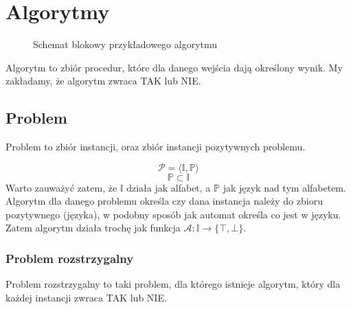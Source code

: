 \documentclass{../notatki}
\begin{document}
\section{Algorytmy}

\begin{figure}[H]
    \centering
    \caption{Schemat blokowy przykładowego algorytmu}
\end{figure}

Algorytm to zbiór procedur, które dla danego wejścia dają określony wynik. My zakładamy, że algorytm zwraca TAK lub NIE.

\subsection{Problem}

Problem to zbiór instancji, oraz zbiór instancji pozytywnych problemu.

$$
\mathcal{P} = \langle \mathbb{I}, \mathbb{P} \rangle
$$
$$
\mathbb{P} \subset \mathbb{I}
$$
Warto zauważyć zatem, że $\mathbb{I}$ działa jak alfabet, a $\mathbb{P}$ jak język nad tym alfabetem.
Algorytm dla danego problemu określa czy dana instancja należy do zbioru pozytywnego (języka), w podobny sposób jak automat określa co jest w języku.
Zatem algorytm działa trochę jak funkcja $\mathcal{A}: \mathbb{I} \rightarrow \{\top, \bot\}$.

\subsubsection{Problem rozstrzygalny}

Problem rozstrzygalny to taki problem, dla którego istnieje algorytm, który dla każdej instancji zwraca TAK lub NIE.
\end{document}
